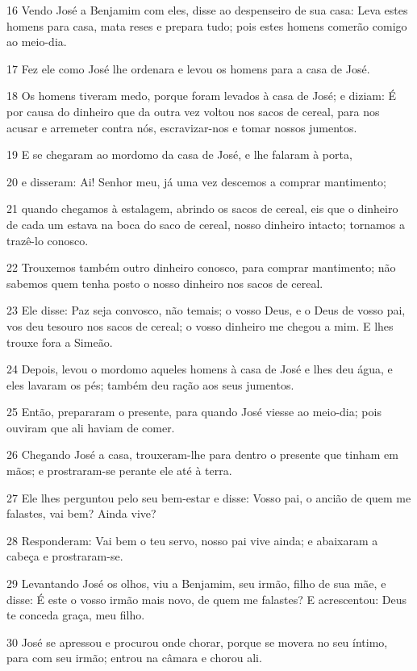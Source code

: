 \par 16 Vendo José a Benjamim com eles, disse ao despenseiro de sua casa: Leva estes homens para casa, mata reses e prepara tudo; pois estes homens comerão comigo ao meio-dia.
\par 17 Fez ele como José lhe ordenara e levou os homens para a casa de José.
\par 18 Os homens tiveram medo, porque foram levados à casa de José; e diziam: É por causa do dinheiro que da outra vez voltou nos sacos de cereal, para nos acusar e arremeter contra nós, escravizar-nos e tomar nossos jumentos.
\par 19 E se chegaram ao mordomo da casa de José, e lhe falaram à porta,
\par 20 e disseram: Ai! Senhor meu, já uma vez descemos a comprar mantimento;
\par 21 quando chegamos à estalagem, abrindo os sacos de cereal, eis que o dinheiro de cada um estava na boca do saco de cereal, nosso dinheiro intacto; tornamos a trazê-lo conosco.
\par 22 Trouxemos também outro dinheiro conosco, para comprar mantimento; não sabemos quem tenha posto o nosso dinheiro nos sacos de cereal.
\par 23 Ele disse: Paz seja convosco, não temais; o vosso Deus, e o Deus de vosso pai, vos deu tesouro nos sacos de cereal; o vosso dinheiro me chegou a mim. E lhes trouxe fora a Simeão.
\par 24 Depois, levou o mordomo aqueles homens à casa de José e lhes deu água, e eles lavaram os pés; também deu ração aos seus jumentos.
\par 25 Então, prepararam o presente, para quando José viesse ao meio-dia; pois ouviram que ali haviam de comer.
\par 26 Chegando José a casa, trouxeram-lhe para dentro o presente que tinham em mãos; e prostraram-se perante ele até à terra.
\par 27 Ele lhes perguntou pelo seu bem-estar e disse: Vosso pai, o ancião de quem me falastes, vai bem? Ainda vive?
\par 28 Responderam: Vai bem o teu servo, nosso pai vive ainda; e abaixaram a cabeça e prostraram-se.
\par 29 Levantando José os olhos, viu a Benjamim, seu irmão, filho de sua mãe, e disse: É este o vosso irmão mais novo, de quem me falastes? E acrescentou: Deus te conceda graça, meu filho.
\par 30 José se apressou e procurou onde chorar, porque se movera no seu íntimo, para com seu irmão; entrou na câmara e chorou ali.
